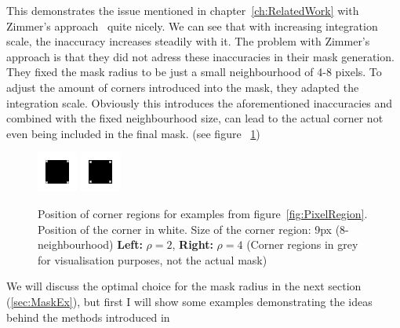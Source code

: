 This demonstrates the issue mentioned in chapter~\ref{ch:RelatedWork} with Zimmer's approach~\cite{zimmer07} quite nicely. 
We can see that with increasing integration scale, the inaccuracy increases
steadily with it. The problem with Zimmer's approach is that they did not adress these inaccuracies in
their mask generation. They fixed the mask radius to be just a small neighbourhood of 4-8 pixels.
To adjust the amount of corners introduced into the mask, they adapted the integration scale.
Obviously this introduces the aforementioned inaccuracies and combined with the fixed neighbourhood
size, can lead to the actual corner not even being included in the final mask. (see figure
~\ref{fig:Inacc})

\begin{figure}[h]
    \centering
    \includegraphics[width=0.4\linewidth]{../Images/rect/rect_2_mask_position.png}
    \includegraphics[width=0.4\linewidth]{../Images/rect/rect_4_mask_position.png}
    \caption{Position of corner regions for examples from figure~\ref{fig:PixelRegion}.
        Position of the corner in white. Size of the corner region: 9px (8-neighbourhood)
    \textbf{Left:} $\rho=2$, \textbf{Right:} $\rho=4$ (Corner regions in grey for visualisation
purposes, not the actual mask)}        
    \label{fig:Inacc}
\end{figure}
We will discuss the optimal choice for the mask radius in the next section (\ref{sec:MaskEx}), but
first I will show some examples demonstrating the ideas behind the methods introduced in

